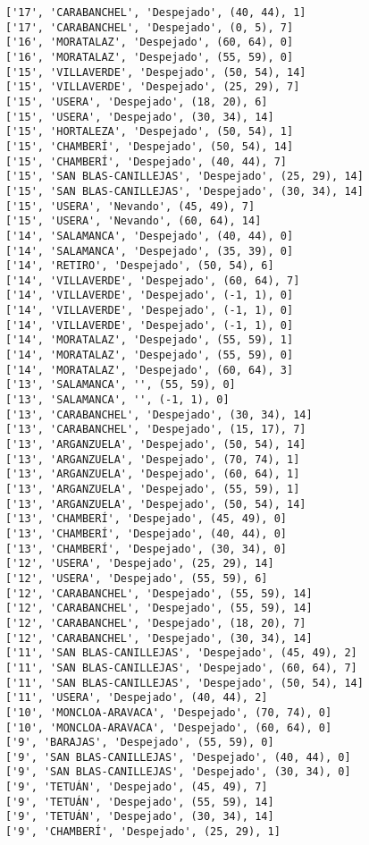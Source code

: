 \documentclass[11pt]{article}
\begin{document}
\begin{Verbatim}[commandchars=\\\{\}]
['17', 'CARABANCHEL', 'Despejado', (40, 44), 1]
['17', 'CARABANCHEL', 'Despejado', (0, 5), 7]
['16', 'MORATALAZ', 'Despejado', (60, 64), 0]
['16', 'MORATALAZ', 'Despejado', (55, 59), 0]
['15', 'VILLAVERDE', 'Despejado', (50, 54), 14]
['15', 'VILLAVERDE', 'Despejado', (25, 29), 7]
['15', 'USERA', 'Despejado', (18, 20), 6]
['15', 'USERA', 'Despejado', (30, 34), 14]
['15', 'HORTALEZA', 'Despejado', (50, 54), 1]
['15', 'CHAMBERÍ', 'Despejado', (50, 54), 14]
['15', 'CHAMBERÍ', 'Despejado', (40, 44), 7]
['15', 'SAN BLAS-CANILLEJAS', 'Despejado', (25, 29), 14]
['15', 'SAN BLAS-CANILLEJAS', 'Despejado', (30, 34), 14]
['15', 'USERA', 'Nevando', (45, 49), 7]
['15', 'USERA', 'Nevando', (60, 64), 14]
['14', 'SALAMANCA', 'Despejado', (40, 44), 0]
['14', 'SALAMANCA', 'Despejado', (35, 39), 0]
['14', 'RETIRO', 'Despejado', (50, 54), 6]
['14', 'VILLAVERDE', 'Despejado', (60, 64), 7]
['14', 'VILLAVERDE', 'Despejado', (-1, 1), 0]
['14', 'VILLAVERDE', 'Despejado', (-1, 1), 0]
['14', 'VILLAVERDE', 'Despejado', (-1, 1), 0]
['14', 'MORATALAZ', 'Despejado', (55, 59), 1]
['14', 'MORATALAZ', 'Despejado', (55, 59), 0]
['14', 'MORATALAZ', 'Despejado', (60, 64), 3]
['13', 'SALAMANCA', '', (55, 59), 0]
['13', 'SALAMANCA', '', (-1, 1), 0]
['13', 'CARABANCHEL', 'Despejado', (30, 34), 14]
['13', 'CARABANCHEL', 'Despejado', (15, 17), 7]
['13', 'ARGANZUELA', 'Despejado', (50, 54), 14]
['13', 'ARGANZUELA', 'Despejado', (70, 74), 1]
['13', 'ARGANZUELA', 'Despejado', (60, 64), 1]
['13', 'ARGANZUELA', 'Despejado', (55, 59), 1]
['13', 'ARGANZUELA', 'Despejado', (50, 54), 14]
['13', 'CHAMBERÍ', 'Despejado', (45, 49), 0]
['13', 'CHAMBERÍ', 'Despejado', (40, 44), 0]
['13', 'CHAMBERÍ', 'Despejado', (30, 34), 0]
['12', 'USERA', 'Despejado', (25, 29), 14]
['12', 'USERA', 'Despejado', (55, 59), 6]
['12', 'CARABANCHEL', 'Despejado', (55, 59), 14]
['12', 'CARABANCHEL', 'Despejado', (55, 59), 14]
['12', 'CARABANCHEL', 'Despejado', (18, 20), 7]
['12', 'CARABANCHEL', 'Despejado', (30, 34), 14]
['11', 'SAN BLAS-CANILLEJAS', 'Despejado', (45, 49), 2]
['11', 'SAN BLAS-CANILLEJAS', 'Despejado', (60, 64), 7]
['11', 'SAN BLAS-CANILLEJAS', 'Despejado', (50, 54), 14]
['11', 'USERA', 'Despejado', (40, 44), 2]
['10', 'MONCLOA-ARAVACA', 'Despejado', (70, 74), 0]
['10', 'MONCLOA-ARAVACA', 'Despejado', (60, 64), 0]
['9', 'BARAJAS', 'Despejado', (55, 59), 0]
['9', 'SAN BLAS-CANILLEJAS', 'Despejado', (40, 44), 0]
['9', 'SAN BLAS-CANILLEJAS', 'Despejado', (30, 34), 0]
['9', 'TETUÁN', 'Despejado', (45, 49), 7]
['9', 'TETUÁN', 'Despejado', (55, 59), 14]
['9', 'TETUÁN', 'Despejado', (30, 34), 14]
['9', 'CHAMBERÍ', 'Despejado', (25, 29), 1]

\end{Verbatim}
\end{document}
